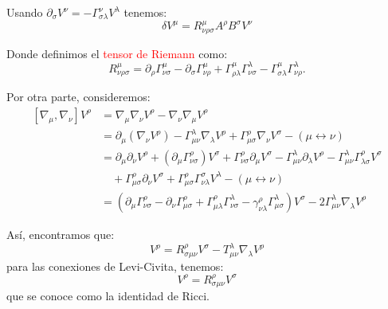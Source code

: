 \documentclass[../main]{subfiles}
\begin{document}
\begin{adjustwidth}{0pt}{-100pt}
Usando $\partial_{\sigma}V^{\nu}=-\Gamma^{\nu}_{\sigma\lambda}V^{\lambda}$ tenemos:
\begin{equation}
    \delta V^{\mu}=R^{\mu}_{\nu\rho\sigma}A^{\rho}B^{\sigma}V^{\nu}
\end{equation}

Donde definimos el \textcolor{red}{tensor de Riemann} como:
\begin{equation}
    R^{\mu}_{\nu\rho\sigma}=\partial_{\rho}\Gamma^{\mu}_{\nu\sigma}-\partial_{\sigma}\Gamma^{\mu}_{\nu\rho}+\Gamma^{\mu}_{\rho\lambda}\Gamma^{\lambda}_{\nu\sigma}-\Gamma^{\mu}_{\sigma\lambda}\Gamma^{\lambda}_{\nu\rho}.
\end{equation}

Por otra parte, consideremos:
\begin{equation}
    \begin{aligned}
        [\nabla_{\mu}, \nabla_{\nu}]V^{\rho}&=\nabla_{\mu}\nabla_{\nu} V^{\rho}-\nabla_{\nu}\nabla_{\mu}V^{\rho}\\
        &=\partial_{\mu}(\nabla_{\nu}V^{\rho})-\Gamma^{\lambda}_{\mu\nu}\nabla_{\lambda}V^{\rho}+\Gamma^{\rho}_{\mu\sigma}\nabla_{\nu}V^{\sigma}-(\mu \leftrightarrow \nu)\\
        &=\partial_{\mu}\partial_{\nu}V^{\rho}+(\partial_{\mu}\Gamma^{\rho}_{\nu\sigma})V^{\sigma}+\Gamma^{\rho}_{\nu\sigma}\partial_{\mu}V^{\sigma}-\Gamma^{\lambda}_{\mu\nu}\partial_{\lambda}V^{\rho}-\Gamma^{\lambda}_{\mu\nu}\Gamma^{\rho}_{\lambda\sigma}V^{\sigma}\\
        &\quad +\Gamma^{\rho}_{\mu\sigma}\partial_{\nu}V^{\sigma}+\Gamma^{\rho}_{\mu\sigma}\Gamma^{\sigma}_{\nu\lambda}V^{\lambda}-(\mu \leftrightarrow \nu)\\
        &=(\partial_{\mu}\Gamma^{\rho}_{\nu\sigma}-\partial_{\nu}\Gamma^{\rho}_{\mu\sigma}+\Gamma^{\rho}_{\mu\lambda}\Gamma^{\lambda}_{\nu\sigma}-\gamma^{\rho}_{\nu\lambda}\Gamma^{\lambda}_{\mu\sigma})V^{\sigma}-2\Gamma^{\lambda}_{\mu\nu}\nabla_{\lambda}V^{\rho}
    \end{aligned}
\end{equation}

Así, encontramos que:
\begin{equation}
    [\nabla_{\mu}, \nabla_{\nu}]V^{\rho}=R^{\rho}_{\sigma\mu\nu}V^{\sigma}-T^{\lambda}_{\mu\nu}\nabla_{\lambda}V^{\rho}
\end{equation}
para las conexiones de Levi-Civita, tenemos:
\begin{equation}
    [\nabla_{\mu}, \nabla_{\nu}]V^{\rho}=R^{\rho}_{\sigma\mu\nu}V^{\sigma}
\end{equation}
que se conoce como la identidad de Ricci.


\end{adjustwidth}
\end{document}
